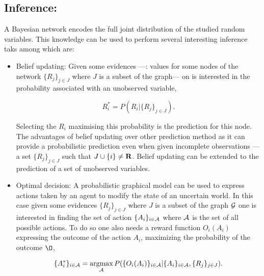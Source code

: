 \documentclass[a4paper,11pt]{report}
\begin{document}
    \subsection{Inference:}
      \label{subsec:PGMs/BN/Inference}
      
			A Bayesian network encodes the full joint distribution of the studied random variables. This knowledge can be used to perform several interesting inference taks among which are:\\
				
     \begin{itemize}
        \item Belief updating: Given some evidences ---\ie: values for some nodes of the network $\{R_{j}\}_{j \in J}$ where $J$ is a subset of the graph--- on is interested in the probability associated with an unobserved variable,
        
        \begin{equation}
					R_{i}^{\ast} = P(R_{i}|\{R_{j}\}_{j \in J}).
					\label{eq:BN inference BEL}
				\end{equation}
				
				Selecting the $R_{i}$ maximising this probability is the prediction for this node. The advantages of belief updating over other prediction method as it can provide a probabilistic prediction even when given incomplete observations ---\ie a set $\{R_{j}\}_{j \in J}$ such that $J \cup \{i\} \neq {\bf R}$. Belief updating can be extended to the prediction of a set of unobserved variables.\\
				
				\item Optimal decision: A probabilistic graphical model can be used to express actions taken by an agent to modify the state of an uncertain world. In this case given some evidences $\{R_{j}\}_{j \in J}$ where $J$ is a subset of the graph $\mathcal{G}$ one is interested in finding the set of action $\{A_{i}\}_{i \in \mathcal{A}}$ where $\mathcal{A}$ is the set of all possible actions. To do so one also needs a reward function $O_{i}(A_{i})$ expressing the outcome of the action $A_{i}$,  maximizing the probability of the outcome $\O$,

				\begin{equation}
					\{A_{i}^{\ast}\}_{i \in \mathcal{A}} =\mathop{\rm argmax}_{\mathcal{A}} P(\{O_{i}(A_{i})\}_{i \in \mathcal{A}} | \{A_{i}\}_{i \in \mathcal{A}}, \{R_{j}\}_{j \in J}).
					\label{eq:BN inference optimal decision}
				\end{equation}
				

\end{itemize}
\end{document}
